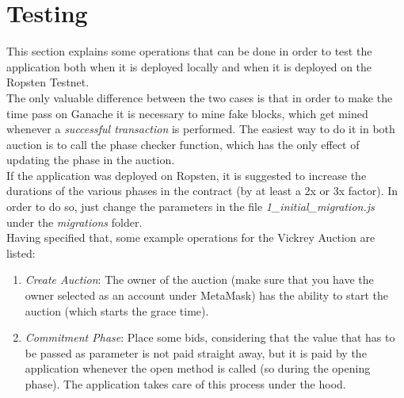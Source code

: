 \documentclass[11pt, a4paper]{report}
\begin{document}
\section*{Testing}
	This section explains some operations that can be done in order to test the application both when it is deployed locally and when it is deployed on the Ropsten Testnet. \\
	The only valuable difference between the two cases is that in order to make the time pass on Ganache it is necessary to mine fake blocks, which get mined whenever a \emph{successful transaction} is performed. The easiest way to do it in both auction is to call the phase checker function, which has the only effect of updating the phase in the auction. \\
	If the application was deployed on Ropsten, it is suggested to increase the durations of the various phases in the contract (by at least a 2x or 3x factor). In order to do so, just change the parameters in the file \emph{1\_initial\_migration.js} under the \emph{migrations} folder. \\
	Having specified that, some example operations for the Vickrey Auction are listed:
	\begin{enumerate}
		\item \emph{Create Auction}: The owner of the auction (make sure that you have the owner selected as an account under MetaMask) has the ability to start the auction (which starts the grace time). 
		\item \emph{Commitment Phase}: Place some bids, considering that the value that has to be passed as parameter is not paid straight away, but it is paid by the application whenever the open method is called (so during the opening phase). The application takes care of this process under the hood.
	\end{enumerate}
\end{document}

